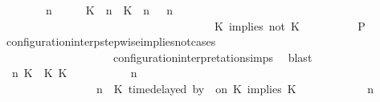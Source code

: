 \begin{isabellebody}
\ \ \ \ \ \ \ {\isacartoucheopen}{\isacharparenleft}{\isasymGamma}\ n\ {\isasymturnstile}\ {\isasymPsi}\ {\isasymtriangleright}\ {\isasymPhi}\ {\isacharequal}\ {\isacharparenleft}{\isacharparenleft}{\isacharparenleft}K\ {\isasymUp}\ n{\isacharparenright}\ {\isacharhash}\ {\isacharparenleft}K\ {\isasymnot}{\isasymUp}\ n{\isacharparenright}\ {\isacharhash}\ {\isasymGamma}{\isacharparenright}{\isacharcomma}\ n\isanewline
\ \ \ \ \ \ \ \ \ \ \ \ \ \ \ \ \ \ \ \ \ \ \ \ \ \ \ \ \ \ \ \ \ \ \ {\isasymturnstile}\ {\isasymPsi}\ {\isasymtriangleright}\ {\isacharparenleft}{\isacharparenleft}K\ implies\ not\ K\ {\isacharhash}\ {\isasymPhi}{\isacharparenright}{\isacharparenright}{\isacartoucheclose}\isanewline
\ \ \ \ \ \ \isamarkupfalse%
\ {\isacharquery}P\ \isamarkupfalse%
\ configuration{\isacharunderscore}interp{\isacharunderscore}stepwise{\isacharunderscore}implies{\isacharunderscore}not{\isacharunderscore}cases\isanewline
\ \ \ \ \ \ \ \ \ \ \ \ \ \ \ \ \ \ \ \ configuration{\isacharunderscore}interpretation{\isachardot}simps\ \isamarkupfalse%
\ blast\isanewline
\ \ \ \ \isamarkupfalse%
\isanewline
\ \ \ \ \ \ \isamarkupfalse%
\ {\isasymGamma}\ n\ K\ {\isasymdelta}{\isasymtau}\ K\ K\ {\isasymPsi}\ {\isasymPhi}\isanewline
\ \ \ \ \ \ \isamarkupfalse%
\ {\isacartoucheopen}{\isacharparenleft}{\isasymGamma}\ n\ {\isasymturnstile}\ {\isasymPsi}\ {\isasymtriangleright}\ {\isasymPhi}\ {\isacharequal}\isanewline
\ \ \ \ \ \ \ \ \ \ \ \ \ \ \ \ {\isacharparenleft}{\isasymGamma}{\isacharcomma}\ n\ {\isasymturnstile}\ {\isacharparenleft}{\isacharparenleft}K\ time{\isacharminus}delayed\ by\ {\isasymdelta}{\isasymtau}\ on\ K\ implies\ K\ {\isacharhash}\ {\isasymPsi}{\isacharparenright}\ {\isasymtriangleright}\ {\isasymPhi}{\isacharparenright}{\isacartoucheclose}\isanewline
\ \ \ \ \ \ \ {\isacartoucheopen}{\isacharparenleft}{\isasymGamma}\ n\ {\isasymturnstile}\ {\isasymPsi}\ {\isasymtriangleright}\ {\isasymPhi}\ {\isacharequal}\isanewline

\end{isabellebody}
